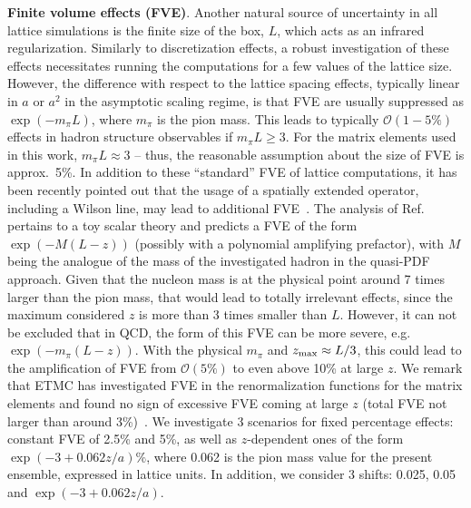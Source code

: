 \textbf{Finite volume effects (FVE)}. Another natural source of uncertainty in
all lattice simulations is the finite size of the box, $L$, which acts as an
infrared regularization. Similarly to discretization effects, a robust
investigation of these effects necessitates running the computations for a few
values of the lattice size. However, the difference with respect to the lattice
spacing effects, typically linear in $a$ or $a^2$ in the asymptotic scaling
regime, is that FVE are usually suppressed as $\exp(-m_\pi L)$, where $m_\pi$ is
the pion mass. This leads to typically $\mathcal{O}(1-5\%)$ effects in hadron
structure observables if $m_\pi L\geq 3$. For the matrix elements used in this
work, $m_\pi L\approx3$ -- thus, the reasonable assumption about the size of FVE
is approx.\ 5\%. In addition to these ``standard'' FVE of lattice computations,
it has been recently pointed out that the usage of a spatially extended
operator, including a Wilson line, may lead to additional
FVE~\cite{Briceno:2018lfj}. The analysis of Ref.~\cite{Briceno:2018lfj}
pertains to a toy scalar theory and predicts a FVE of the form $\exp(-M (L-z))$
(possibly with a polynomial amplifying prefactor), with $M$ being the analogue
of the mass of the investigated hadron in the quasi-PDF approach. Given that the
nucleon mass is at the physical point around 7 times larger than the pion mass,
that would lead to totally irrelevant effects, since the maximum considered $z$
is more than 3 times smaller than $L$. However, it can not be excluded that in
QCD, the form of this FVE can be more severe, e.g.\ $\exp(-m_\pi (L-z))$. With
the physical $m_\pi$ and $z_{\rm max}\approx L/3$, this could lead to the
amplification of FVE from $\mathcal{O}(5\%)$ to even above 10\% at large $z$. We
remark that ETMC has investigated FVE in the renormalization functions for the
matrix elements and found no sign of excessive FVE coming at large $z$ (total
FVE not larger than around 3\%)~\cite{Alexandrou:2019lfo}. We investigate 3
scenarios for fixed percentage effects: constant FVE of 2.5\% and 5\%, as well
as $z$-dependent ones of the form $\exp(-3+0.062z/a)\%$, where 0.062 is the pion
mass value for the present ensemble, expressed in lattice units. In addition, we
consider 3 shifts: 0.025, 0.05 and $\exp(-3+0.062z/a)$.

